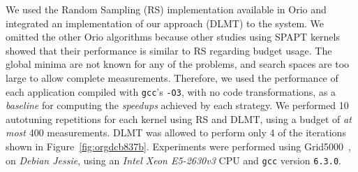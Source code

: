 \documentclass[conference]{IEEEtran}
\begin{document}
We used the Random Sampling (RS) implementation available in Orio and integrated
an implementation of our approach (DLMT) to the system. We omitted the other
Orio algorithms because other studies using SPAPT
kernels~\cite{balaprakash2011can,balaprakash2012experimental} showed that
their performance is similar to RS regarding budget usage. The global minima are
not known for any of the problems, and search spaces are too large to allow
complete measurements. Therefore, we used the performance of each application
compiled with \texttt{gcc}'s \texttt{-O3}, with no code transformations, as a
\emph{baseline} for computing the \emph{speedups} achieved by each strategy. We performed
10 autotuning repetitions for each kernel using RS and DLMT, using a budget of
\emph{at most} 400 measurements. DLMT was allowed to perform only 4 of the iterations
shown in Figure~\ref{fig:orgdcb837b}. Experiments were performed using
Grid5000~\cite{balouek2013adding}, on \emph{Debian Jessie}, using an \emph{Intel
Xeon E5-2630v3} CPU and \texttt{gcc} version \texttt{6.3.0}.
\end{document}
